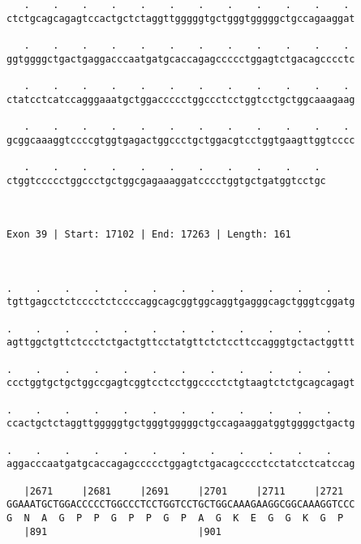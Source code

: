 \documentclass{article}
\begin{document}
\begin{Verbatim}
   .    .    .    .    .    .    .    .    .    .    .    . 
ctctgcagcagagtccactgctctaggttgggggtgctgggtgggggctgccagaaggat
                                                            
   .    .    .    .    .    .    .    .    .    .    .    . 
ggtggggctgactgaggacccaatgatgcaccagagccccctggagtctgacagcccctc
                                                            
   .    .    .    .    .    .    .    .    .    .    .    . 
ctatcctcatccagggaaatgctggaccccctggccctcctggtcctgctggcaaagaag
                                                            
   .    .    .    .    .    .    .    .    .    .    .    . 
gcggcaaaggtccccgtggtgagactggccctgctggacgtcctggtgaagttggtcccc
                                                            
   .    .    .    .    .    .    .    .    .    .    . 
ctggtccccctggccctgctggcgagaaaggatcccctggtgctgatggtcctgc
                                                       
                                                       
 
Exon 39 | Start: 17102 | End: 17263 | Length: 161



.    .    .    .    .    .    .    .    .    .    .    .    
tgttgagcctctcccctctccccaggcagcggtggcaggtgagggcagctgggtcggatg
                                                            
.    .    .    .    .    .    .    .    .    .    .    .    
agttggctgttctccctctgactgttcctatgttctctccttccagggtgctactggttt
                                                            
.    .    .    .    .    .    .    .    .    .    .    .    
ccctggtgctgctggccgagtcggtcctcctggcccctctgtaagtctctgcagcagagt
                                                            
.    .    .    .    .    .    .    .    .    .    .    .    
ccactgctctaggttgggggtgctgggtgggggctgccagaaggatggtggggctgactg
                                                            
.    .    .    .    .    .    .    .    .    .    .    .    
aggacccaatgatgcaccagagccccctggagtctgacagcccctcctatcctcatccag
                                                            
   |2671     |2681     |2691     |2701     |2711     |2721  
GGAAATGCTGGACCCCCTGGCCCTCCTGGTCCTGCTGGCAAAGAAGGCGGCAAAGGTCCC
G  N  A  G  P  P  G  P  P  G  P  A  G  K  E  G  G  K  G  P  
   |891                          |901                       
  

\end{Verbatim}
\end{document}
